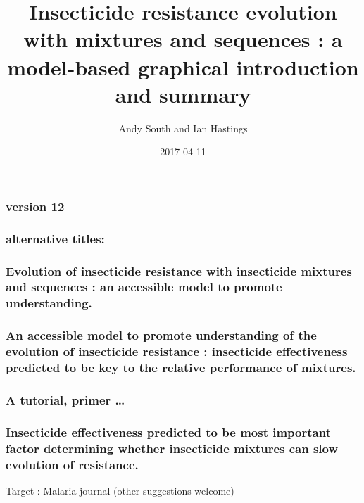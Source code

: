 \documentclass[11pt,]{article}
\title{Insecticide resistance evolution with mixtures and sequences : a
model-based graphical introduction and summary}
\author{Andy South and Ian Hastings}
\date{2017-04-11}
\begin{document}
\maketitle

\subsubsection{version 12}\label{version-12}

\subsubsection{alternative titles:}\label{alternative-titles}

\subsubsection{Evolution of insecticide resistance with insecticide
mixtures and sequences : an accessible model to promote
understanding.}\label{evolution-of-insecticide-resistance-with-insecticide-mixtures-and-sequences-an-accessible-model-to-promote-understanding.}

\subsubsection{An accessible model to promote understanding of the
evolution of insecticide resistance : insecticide effectiveness
predicted to be key to the relative performance of
mixtures.}\label{an-accessible-model-to-promote-understanding-of-the-evolution-of-insecticide-resistance-insecticide-effectiveness-predicted-to-be-key-to-the-relative-performance-of-mixtures.}

\subsubsection{A tutorial, primer \ldots{}}\label{a-tutorial-primer}

\subsubsection{Insecticide effectiveness predicted to be most important
factor determining whether insecticide mixtures can slow evolution of
resistance.}\label{insecticide-effectiveness-predicted-to-be-most-important-factor-determining-whether-insecticide-mixtures-can-slow-evolution-of-resistance.}

Target : Malaria journal (other suggestions welcome)
\end{document}
